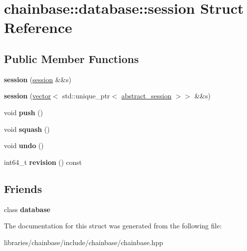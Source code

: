 \hypertarget{structchainbase_1_1database_1_1session}{}\section{chainbase\+:\+:database\+:\+:session Struct Reference}
\label{structchainbase_1_1database_1_1session}
\subsection*{Public Member Functions}
\begin{DoxyCompactItemize}
\item 
\mbox{\label{structchainbase_1_1database_1_1session_a82419c657b111b8f5bd273d4a5987961}} 
{\bfseries session} (\mbox{\hyperlink{structchainbase_1_1database_1_1session}{session}} \&\&s)
\item 
\mbox{\label{structchainbase_1_1database_1_1session_a5829864e1ca08787de7540e34c5a4786}} 
{\bfseries session} (\mbox{\hyperlink{classstd_1_1vector}{vector}}$<$ std\+::unique\+\_\+ptr$<$ \mbox{\hyperlink{classchainbase_1_1abstract__session}{abstract\+\_\+session}} $>$$>$ \&\&s)
\item 
\mbox{\label{structchainbase_1_1database_1_1session_a68232e2d602da52b8c615b7fb1f0b6d0}} 
void {\bfseries push} ()
\item 
\mbox{\label{structchainbase_1_1database_1_1session_a6f811596bebbe29cc1f39e367fbd9415}} 
void {\bfseries squash} ()
\item 
\mbox{\label{structchainbase_1_1database_1_1session_ae11a9491ccaca0ef520460dc5b2f2bc2}} 
void {\bfseries undo} ()
\item 
\mbox{\label{structchainbase_1_1database_1_1session_a0202dcf0284178e60ffc2cefcf9213d6}} 
int64\+\_\+t {\bfseries revision} () const
\end{DoxyCompactItemize}
\subsection*{Friends}
\begin{DoxyCompactItemize}
\item 
\mbox{\label{structchainbase_1_1database_1_1session_a18fdb2eb327d986df9ddba68498b8cf9}} 
class {\bfseries database}
\end{DoxyCompactItemize}


The documentation for this struct was generated from the following file\+:\begin{DoxyCompactItemize}
\item 
libraries/chainbase/include/chainbase/chainbase.\+hpp\end{DoxyCompactItemize}
